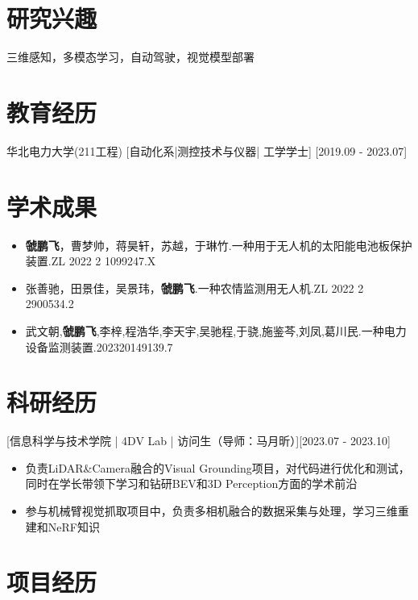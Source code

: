 \documentclass{resume}
\begin{document}

\ResumeTitle

\section{研究兴趣}
三维感知，多模态学习，自动驾驶，视觉模型部署


\section{教育经历}
\ResumeItem
{华北电力大学(211工程)}
[\textnormal{自动化系|测控技术与仪器|} 工学学士]
[2019.09 - 2023.07]


\section{学术成果}
\begin{itemize}
  \item \textbf{虢鹏飞}，曹梦帅，蒋昊轩，苏越，于琳竹.一种用于无人机的太阳能电池板保护装置.ZL 2022 2 1099247.X
  \item 张善驰，田景佳，吴景玮，\textbf{虢鹏飞}.一种农情监测用无人机.ZL 2022 2 2900534.2
  \item 武文朝,\textbf{虢鹏飞},李梓,程浩华,李天宇,吴驰程,于骁,施鉴芩,刘凤,葛川民.一种电力设备监测装置.202320149139.7
\end{itemize}
\section{科研经历}
[信息科学与技术学院 | 4DV Lab | 访问生（导师：马月昕）][2023.07 - 2023.10]
\begin{itemize}
    \item 负责LiDAR\&Camera融合的Visual Grounding项目，对代码进行优化和测试，同时在学长带领下学习和钻研BEV和3D Perception方面的学术前沿
    \item 参与机械臂视觉抓取项目中，负责多相机融合的数据采集与处理，学习三维重建和NeRF知识
\end{itemize}
\section{项目经历}
\end{document}
